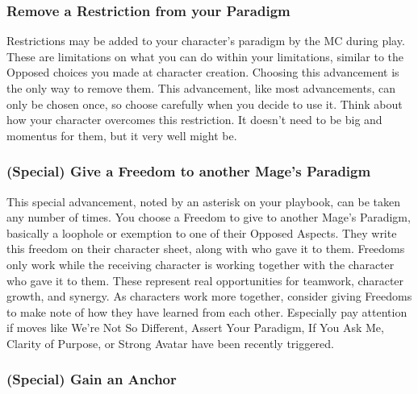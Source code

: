 \documentclass[
  oneside,
  statementpaper,
  9pt]{memoir}
\begin{document}
\hypertarget{remove-a-restriction-from-your-paradigm}{%
\subsubsection{Remove a Restriction from your
Paradigm}\label{remove-a-restriction-from-your-paradigm}}

\begin{Player}

Restrictions may be added to your character’s paradigm by the MC during play. These are limitations on what you can do within your limitations, similar to the Opposed choices you made at character creation. Choosing this advancement is the only way to remove them. This advancement, like most advancements, can only be chosen once, so choose carefully when you decide to use it. Think about how your character overcomes this restriction. It doesn’t need to be big and momentus for them, but it very well might be. 

\end{Player}

\hypertarget{special-give-a-freedom-to-another-mages-paradigm}{%
\subsubsection{(Special) Give a Freedom to another Mage's
Paradigm}\label{special-give-a-freedom-to-another-mages-paradigm}}

\begin{Player}

This special advancement, noted by an asterisk on your playbook, can be taken any number of times. You choose a Freedom to give to another Mage’s Paradigm, basically a loophole or exemption to one of their Opposed Aspects. They write this freedom on their character sheet, along with who gave it to them. Freedoms only work while the receiving character is working together with the character who gave it to them. These represent real opportunities for teamwork, character growth, and synergy. As characters work more together, consider giving Freedoms to make note of how they have learned from each other. Especially pay attention if  moves like We’re Not So Different, Assert Your Paradigm, If You Ask Me, Clarity of Purpose, or Strong Avatar have been recently triggered.

\end{Player}

\hypertarget{special-gain-an-anchor}{%
\subsubsection{(Special) Gain an Anchor}\label{special-gain-an-anchor}}
\end{document}
